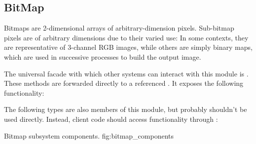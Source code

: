 \newcommand{\bitmaparea}[4]{
    \index{#1}
    \pbodyitem{#2}{
        \textbf{Pixel Dimensions:} {#3} \newline
        {#4}
    }
}

\subsection{BitMap}
Bitmaps are 2-dimensional arrays of arbitrary-dimension pixels.
Sub-bitmap pixels are of arbitrary dimensions due to their varied use: In some contexts, they are representative of 3-channel RGB images, while others are simply binary maps, which are used in successive processes to build the output image.

The universal facade with which other systems can interact with this module is \bmftype.
These methods are forwarded directly to a referenced \bmctype.
It exposes the following functionality:
\begin{itemize}
\end{itemize}

The following types are also members of this module, but probably shouldn't be used directly.  Instead, client code should access functionality through \bmftype:
\begin{itemize}
\end{itemize}

{Bitmap subsystem components.}
{fig:bitmap_components}


